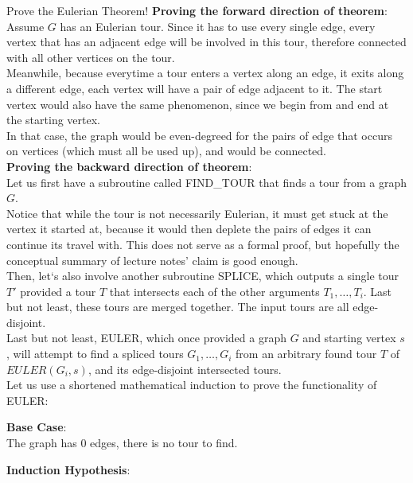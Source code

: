 \begin{ln-think}{Prove the Eulerian Theorem!}{}
    \textbf{Proving the forward direction of theorem}: \\
    Assume $G$ has an Eulerian tour. Since it has to use every single edge, every vertex that has an adjacent edge will be involved in this tour, therefore connected with all other vertices on the tour. \\
    Meanwhile, because everytime a tour enters a vertex along an edge, it exits along a different edge, each vertex will have a pair of edge adjacent to it. The start vertex would also have the same phenomenon, since we begin from and end at the starting vertex. \\
    In that case, the graph would be even-degreed for the pairs of edge that occurs on vertices (which must all be used up), and would be connected. \\
    \textbf{Proving the backward direction of theorem}: \\
    Let us first have a subroutine called FIND\_TOUR that finds a tour from a graph $G$. \\
    Notice that while the tour is not necessarily Eulerian, it must get stuck at the vertex it started at, because it would then deplete the pairs of edges it can continue its travel with. This does not serve as a formal proof, but hopefully the conceptual summary of lecture notes' claim is good enough. \\
    Then, let`s also involve another subroutine SPLICE, which outputs a single tour $T'$ provided a tour $T$ that intersects each of the other arguments $T_1, \dots, T_i$. Last but not least, these tours are merged together. The input tours are all edge-disjoint. \\
    Last but not least, EULER, which once provided a graph $G$ and starting vertex $s$, will attempt to find a spliced tours $G_1, \dots, G_i$ from an arbitrary found tour $T$ of $EULER(G_i, s)$, and its edge-disjoint intersected tours. \\
    Let us use a shortened mathematical induction to prove the functionality of EULER: \\
    \begin{bindenum}
        \item[] {
            \textbf{Base Case}: \\
            The graph has 0 edges, there is no tour to find.
        }
        \item[] {
            \textbf{Induction Hypothesis}: \\
}
\end{bindenum}
\end{ln-think}
